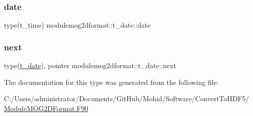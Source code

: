 \subsubsection{\texorpdfstring{date}{date}}
{\footnotesize\ttfamily type(t\+\_\+time) modulemog2dformat\+::t\+\_\+date\+::date\hspace{0.3cm}{\ttfamily [private]}}

\mbox{\label{structmodulemog2dformat_1_1t__date_ab44d246d6b50d32432bd0350eefe65f9}} 
\subsubsection{\texorpdfstring{next}{next}}
{\footnotesize\ttfamily type(\mbox{\hyperlink{structmodulemog2dformat_1_1t__date}{t\+\_\+date}}), pointer modulemog2dformat\+::t\+\_\+date\+::next\hspace{0.3cm}{\ttfamily [private]}}



The documentation for this type was generated from the following file\+:\begin{DoxyCompactItemize}
\item 
C\+:/\+Users/administrator/\+Documents/\+Git\+Hub/\+Mohid/\+Software/\+Convert\+To\+H\+D\+F5/\mbox{\hyperlink{_module_m_o_g2_d_format_8_f90}{Module\+M\+O\+G2\+D\+Format.\+F90}}\end{DoxyCompactItemize}
